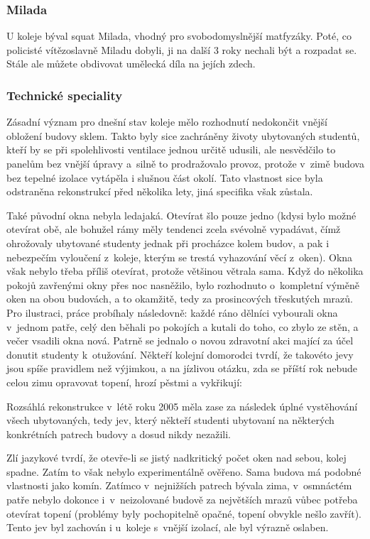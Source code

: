 \subsubsection{Milada}
U koleje býval squat Milada, vhodný pro svobodomyslnější matfyzáky. Poté, co policisté vítězoslavně Miladu dobyli, ji na další 3 roky nechali být a rozpadat se. Stále ale můžete obdivovat umělecká díla na jejích zdech.

\subsubsection{Technické speciality}

Zásadní význam pro dnešní stav koleje mělo rozhodnutí nedokončit
vnější obložení budovy sklem. Takto byly sice zachráněny životy
ubytovaných studentů, kteří by se při spolehlivosti ventilace
jednou určitě udusili, ale nesvědčilo to panelům bez vnější úpravy
a~silně to prodražovalo provoz, protože v~zimě budova bez tepelné
izolace vytápěla i slušnou část okolí. Tato vlastnost sice byla
odstraněna rekonstrukcí před několika lety, jiná specifika však
zůstala.

Také původní okna nebyla ledajaká. Otevírat šlo pouze jedno (kdysi
bylo možné otevírat obě, ale bohužel rámy měly tendenci zcela
svévolně vypadávat, čímž o\-hro\-žo\-va\-ly ubytované studenty jednak při
procházce kolem budov, a pak i nebezpečím vyloučení z~koleje,
kterým se trestá vyhazování věcí z~oken). Okna však nebylo třeba
příliš otevírat, protože většinou větrala sama. Když do několika
pokojů zavřenými okny přes noc nasněžilo, bylo rozhodnuto
o~kompletní výměně oken na obou budovách, a to okamžitě, tedy za
prosincových třeskutých mrazů. Pro ilustraci, práce probíhaly
následovně: každé ráno dělníci vybourali okna v~jednom patře, celý
den běhali po pokojích a kutali do toho, co zbylo ze stěn, a večer
vsadili okna nová.  Patrně se jednalo o novou zdravotní akci
mající za účel donutit studenty k~otužování.  Někteří kolejní
domorodci tvrdí, že takovéto jevy jsou spíše pravidlem než
výjimkou, a na jízlivou otázku, zda se příští rok nebude celou
zimu opravovat topení, hrozí pěstmi a vykřikují: 

Rozsáhlá rekonstrukce v~létě roku 2005 měla zase za následek úplné
vystěhování všech ubytovaných, tedy jev, který někteří studenti
ubytovaní na některých kon\-kré\-tních patrech budovy a dosud nikdy
nezažili.

Zlí jazykové tvrdí, že otevře-li se jistý nadkritický počet oken
nad sebou, kolej spadne. Zatím to však nebylo experimentálně
ověřeno. Sama budova má podobné vlastnosti jako komín. Zatímco
v~nejnižších patrech bývala zima, v~osmnáctém patře nebylo dokonce
i~v~neizolované budově za největších mrazů vůbec potřeba otevírat
topení (problémy byly pochopitelně opačné, topení obvykle nešlo
zavřít). Tento jev byl zachován i u~koleje s~vnější izolací, ale
byl výrazně oslaben.

